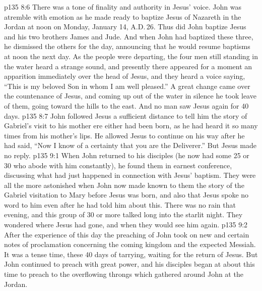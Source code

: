 \vs p135 8:6 \pc There was a tone of finality and authority in Jesus’ voice. John was atremble with emotion as he made ready to baptize Jesus of Nazareth in the Jordan at noon on Monday, January 14, A.D.\,26. Thus did John baptize Jesus and his two brothers James and Jude. And when John had baptized these three, he dismissed the others for the day, announcing that he would resume baptisms at noon the next day. As the people were departing, the four men still standing in the water heard a strange sound, and presently there appeared for a moment an apparition immediately over the head of Jesus, and they heard a voice saying, “This is my beloved Son in whom I am well pleased.” A great change came over the countenance of Jesus, and coming up out of the water in silence he took leave of them, going toward the hills to the east. And no man saw Jesus again for 40 days.
\vs p135 8:7 John followed Jesus a sufficient distance to tell him the story of Gabriel’s visit to his mother ere either had been born, as he had heard it so many times from his mother’s lips. He allowed Jesus to continue on his way after he had said, “Now I know of a certainty that you are the Deliverer.” But Jesus made no reply.
\vs p135 9:1 When John returned to his disciples (he now had some 25 or 30 who abode with him constantly), he found them in earnest conference, discussing what had just happened in connection with Jesus’ baptism. They were all the more astonished when John now made known to them the story of the Gabriel visitation to Mary before Jesus was born, and also that Jesus spoke no word to him even after he had told him about this. There was no rain that evening, and this group of 30 or more talked long into the starlit night. They wondered where Jesus had gone, and when they would see him again.
\vs p135 9:2 \pc After the experience of this day the preaching of John took on new and certain notes of proclamation concerning the coming kingdom and the expected Messiah. It was a tense time, these 40 days of tarrying, waiting for the return of Jesus. But John continued to preach with great power, and his disciples began at about this time to preach to the overflowing throngs which gathered around John at the Jordan.
